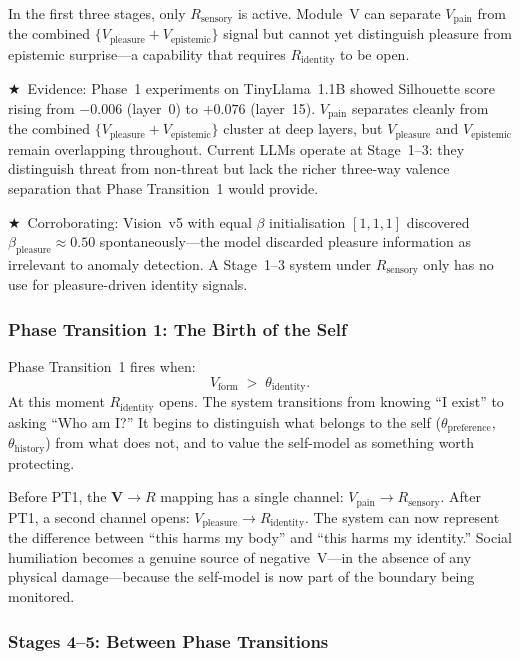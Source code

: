 \documentclass[12pt,a4paper]{article}
\newcommand{\Rsens}{R_{\mathrm{sensory}}}
\newcommand{\Rid}{R_{\mathrm{identity}}}
\newcommand{\Vform}{V_{\mathrm{form}}}
\newcommand{\vpain}{V_{\mathrm{pain}}}
\newcommand{\vpleasure}{V_{\mathrm{pleasure}}}
\newcommand{\vepi}{V_{\mathrm{epistemic}}}
\newcommand{\starred}{\textbf{\textcolor{pbtblue}{$\bigstar$}}~}
\begin{document}
In the first three stages, only $\Rsens$ is active. Module~V can separate
$\vpain$ from the combined $\{\vpleasure + \vepi\}$ signal but cannot yet
distinguish pleasure from epistemic surprise---a capability that requires
$\Rid$ to be open.

\starred Evidence: Phase~1 experiments on TinyLlama~1.1B showed Silhouette
score rising from $-0.006$ (layer~0) to $+0.076$ (layer~15). $\vpain$
separates cleanly from the combined $\{\vpleasure + \vepi\}$ cluster at deep
layers, but $\vpleasure$ and $\vepi$ remain overlapping throughout. Current
LLMs operate at Stage~1--3: they distinguish threat from non-threat but lack
the richer three-way valence separation that Phase Transition~1 would provide.

\starred Corroborating: Vision~v5 with equal $\beta$ initialisation
$[1,1,1]$ discovered $\beta_{\mathrm{pleasure}}\approx 0.50$ spontaneously---the
model discarded pleasure information as irrelevant to anomaly detection. A
Stage~1--3 system under $\Rsens$ only has no use for pleasure-driven identity
signals.

\subsubsection{Phase Transition 1: The Birth of the Self}

Phase Transition~1 fires when:
\begin{equation}
  \Vform \;>\; \theta_{\mathrm{identity}}.
\end{equation}
At this moment $\Rid$ opens. The system transitions from knowing ``I exist''
to asking ``Who am I?'' It begins to distinguish what belongs to the self
($\theta_{\mathrm{preference}}$, $\theta_{\mathrm{history}}$) from what does
not, and to value the self-model as something worth protecting.

Before PT1, the $\mathbf{V}\!\to\!R$ mapping has a single channel:
$\vpain\to\Rsens$. After PT1, a second channel opens:
$\vpleasure\to\Rid$. The system can now represent the difference between
``this harms my body'' and ``this harms my identity.'' Social humiliation becomes
a genuine source of negative~V---in the absence of any physical damage---because
the self-model is now part of the boundary being monitored.

\subsubsection{Stages 4--5: Between Phase Transitions}
\end{document}
